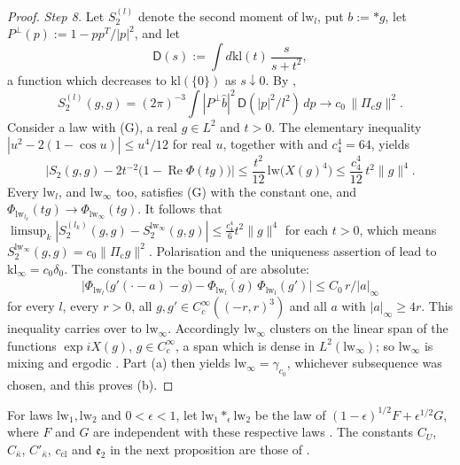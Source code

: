 \documentclass[11pt]{amsart}
\theoremstyle{definition}
\begin{document}
\begin{proof}
\emph{Step 8.}
Let $S_2^{(l)}$ denote the second moment of $\mathrm{lw}_l$, put $b:=\ast g$, let $P^\perp(p):=1-pp^T/|p|^2$, and let
\begin{equation*}
\mathsf D(s):=\int d\mathrm{kl}(t)\,\frac{s}{s+t^2},
\end{equation*}
a function which decreases to $\mathrm{kl}(\{0\})$ as $s\downarrow0$.
By \cite[Theorem~1.4, Part~I\,(d), (f)]{QEDII},
\begin{equation*}
S_2^{(l)}(g,g)=(2\pi)^{-3}\int|P^\perp\hat b|^2\,\mathsf D(|p|^2/l^2)\,dp\longrightarrow c_0\,\|\Pi_{\mathrm c}g\|^2.
\end{equation*}
Consider a law with (G), a real $g\in L^2$ and $t>0$.
The elementary inequality $|u^2-2(1-\cos u)|\le u^4/12$ for real $u$, together with \cite[Lemma~14.3\,(a)]{QEDII} and $c_4^4=64$, yields
\begin{equation*}
\bigl|S_2(g,g)-2t^{-2}\bigl(1-\operatorname{Re}\Phi(tg)\bigr)\bigr|\le\frac{t^2}{12}\,\mathrm{lw}\bigl(X(g)^4\bigr)\le\frac{c_4^4}{12}\,t^2\|g\|^4.
\end{equation*}
Every $\mathrm{lw}_l$, and $\mathrm{lw}_\infty$ too, satisfies (G) with the constant one, and $\Phi_{\mathrm{lw}_{l_k}}(tg)\to\Phi_{\mathrm{lw}_\infty}(tg)$.
It follows that $\limsup_k|S_2^{(l_k)}(g,\allowbreak g)-S_2^{\mathrm{lw}_\infty}(g,\allowbreak g)|\le\frac{c_4^4}6t^2\|g\|^4$ for each $t>0$, which means $S_2^{\mathrm{lw}_\infty}(g,g)=c_0\|\Pi_{\mathrm c}g\|^2$.
Polarisation and the uniqueness assertion of \cite[Theorem~1.4, Part~I\,(d), (f)]{QEDII} lead to $\mathrm{kl}_\infty=c_0\delta_0$.
The constants in the bound of \cite[Theorem~12.39]{QEDII} are absolute:
\begin{equation*}
\bigl|\Phi_{\mathrm{lw}_l}\bigl(g'(\cdot-a)-g\bigr)-\overline{\Phi_{\mathrm{lw}_l}(g)}\,\Phi_{\mathrm{lw}_l}(g')\bigr|\le C_0\,r/|a|_\infty
\end{equation*}
for every $l$, every $r>0$, all $g,g'\in C_c^\infty((-r,r)^3)$ and all $a$ with $|a|_\infty\ge4r$.
This inequality carries over to $\mathrm{lw}_\infty$.
Accordingly $\mathrm{lw}_\infty$ clusters on the linear span of the functions $\exp iX(g)$, $g\in C_c^\infty$, a span which is dense in $L^2(\mathrm{lw}_\infty)$; so $\mathrm{lw}_\infty$ is mixing and ergodic \cite[Section~8.1.4, Lemma~8.14\,(a)]{QEDI}.
Part (a) then yields $\mathrm{lw}_\infty=\gamma_{c_0}$, whichever subsequence was chosen, and this proves (b).
\end{proof}
For laws $\mathrm{lw}_1,\mathrm{lw}_2$ and $0<\epsilon<1$, let
$\mathrm{lw}_1\ast_\epsilon\mathrm{lw}_2$ be the law of
$(1-\epsilon)^{1/2}F+\epsilon^{1/2}G$, where $F$ and $G$ are independent
with these respective laws \cite[Section~21.11.1]{QEDI}.
The constants $C_U$, $C_{\bar\kappa}$, $C'_{\bar\kappa}$,
$c_{\mathrm{cl}}$ and $\mathfrak e_2$ in the next proposition are those of
\cite[Theorem~44]{QEDIII}.
\end{document}
